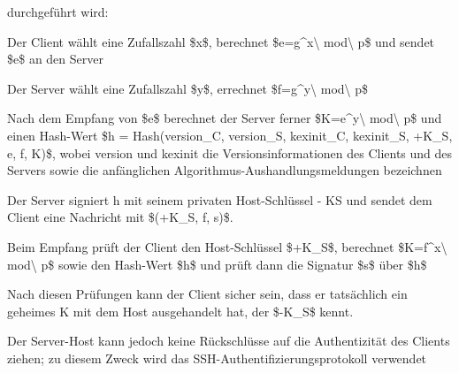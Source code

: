 \documentclass[a4paper]{article}
\begin{document}
\begin{multicols}{3}
\begin{itemize*}
\begin{itemize*}
                  durchgeführt wird:
                  \begin{itemize*}
                        \item Der Client wählt eine Zufallszahl \$x\$, berechnet \$e=g\^{}x\textbackslash{} mod\textbackslash{} p\$ und sendet \$e\$ an den Server
                        \item Der Server wählt eine Zufallszahl \$y\$, errechnet \$f=g\^{}y\textbackslash{} mod\textbackslash{} p\$
                        \item Nach dem Empfang von \$e\$ berechnet der Server ferner \$K=e\^{}y\textbackslash{} mod\textbackslash{} p\$ und einen Hash-Wert \$h = Hash(version\_C, version\_S, kexinit\_C, kexinit\_S, +K\_S, e, f, K)\$, wobei version und kexinit die Versionsinformationen des Clients und des Servers sowie die anfänglichen Algorithmus-Aushandlungsmeldungen bezeichnen
                        \item Der Server signiert h mit seinem privaten Host-Schlüssel - KS und sendet dem Client eine Nachricht mit \$(+K\_S, f, s)\$.
                        \item Beim Empfang prüft der Client den Host-Schlüssel \$+K\_S\$, berechnet \$K=f\^{}x\textbackslash{} mod\textbackslash{} p\$ sowie den Hash-Wert \$h\$ und prüft dann die Signatur \$s\$ über \$h\$
                  \end{itemize*}
                  \item       Nach diesen Prüfungen kann der Client sicher sein, dass er tatsächlich
                  ein geheimes K mit dem Host ausgehandelt hat, der \$-K\_S\$ kennt.
                  \item       Der Server-Host kann jedoch keine Rückschlüsse auf die Authentizität
                  des Clients ziehen; zu diesem Zweck wird das
                  SSH-Authentifizierungsprotokoll verwendet
            \end{itemize*}


\end{itemize*}
\end{multicols}
\end{document}
